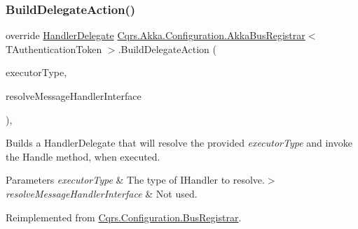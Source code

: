 \subsubsection{\texorpdfstring{Build\+Delegate\+Action()}{BuildDelegateAction()}}
{\footnotesize\ttfamily override \hyperlink{classCqrs_1_1Configuration_1_1HandlerDelegate}{Handler\+Delegate} \hyperlink{classCqrs_1_1Akka_1_1Configuration_1_1AkkaBusRegistrar}{Cqrs.\+Akka.\+Configuration.\+Akka\+Bus\+Registrar}$<$ T\+Authentication\+Token $>$.Build\+Delegate\+Action (\begin{DoxyParamCaption}\item[{Type}]{executor\+Type,  }\item[{Func$<$ Type, I\+Enumerable$<$ Type $>$$>$}]{resolve\+Message\+Handler\+Interface }\end{DoxyParamCaption})\hspace{0.3cm}{\ttfamily [protected]}, {\ttfamily [virtual]}}



Builds a Handler\+Delegate that will resolve the provided {\itshape executor\+Type}  and invoke the Handle method, when executed. 


\begin{DoxyParams}{Parameters}
{\em executor\+Type} & The type of I\+Handler to resolve.$>$\\
\hline
{\em resolve\+Message\+Handler\+Interface} & Not used.\\
\hline
\end{DoxyParams}


Reimplemented from \hyperlink{classCqrs_1_1Configuration_1_1BusRegistrar_a07d27088739f2ae0ac7c551fc6a72ac9_a07d27088739f2ae0ac7c551fc6a72ac9}{Cqrs.\+Configuration.\+Bus\+Registrar}.

\mbox{\label{classCqrs_1_1Akka_1_1Configuration_1_1AkkaBusRegistrar_a0ac474751b2ba8ebb27b885a15fbf053_a0ac474751b2ba8ebb27b885a15fbf053}} 
